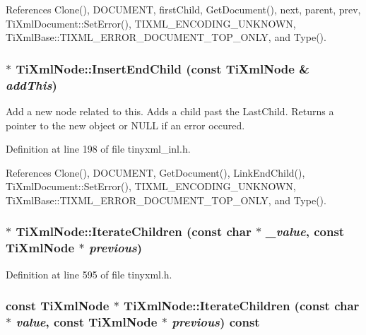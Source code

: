 References Clone(), DOCUMENT, firstChild, GetDocument(), next, parent, prev, TiXmlDocument::SetError(), TIXML\_\-ENCODING\_\-UNKNOWN, TiXmlBase::TIXML\_\-ERROR\_\-DOCUMENT\_\-TOP\_\-ONLY, and Type().\hypertarget{class_ti_xml_node_af287a913ce46d8dbf7ef24fec69bbaf0}{
\subsubsection[{InsertEndChild}]{ $\ast$ TiXmlNode::InsertEndChild (const {\bf TiXmlNode} \& {\em addThis})}}
\label{class_ti_xml_node_af287a913ce46d8dbf7ef24fec69bbaf0}
Add a new node related to this. Adds a child past the LastChild. Returns a pointer to the new object or NULL if an error occured. 

Definition at line 198 of file tinyxml\_\-inl.h.

References Clone(), DOCUMENT, GetDocument(), LinkEndChild(), TiXmlDocument::SetError(), TIXML\_\-ENCODING\_\-UNKNOWN, TiXmlBase::TIXML\_\-ERROR\_\-DOCUMENT\_\-TOP\_\-ONLY, and Type().\hypertarget{class_ti_xml_node_a67ba8275e533e6f76340236c42ea0aea}{
\subsubsection[{IterateChildren}]{$\ast$ TiXmlNode::IterateChildren (const char $\ast$ {\em \_\-value}, \/  const {\bf TiXmlNode} $\ast$ {\em previous})}}
\label{class_ti_xml_node_a67ba8275e533e6f76340236c42ea0aea}


Definition at line 595 of file tinyxml.h.\hypertarget{class_ti_xml_node_af2b86dbe25d3d26fa48180edc5e2a9fc}{
\subsubsection[{IterateChildren}]{\setlength{\rightskip}{0pt plus 5cm}const {\bf TiXmlNode} $\ast$ TiXmlNode::IterateChildren (const char $\ast$ {\em value}, \/  const {\bf TiXmlNode} $\ast$ {\em previous}) const}}
\label{class_ti_xml_node_af2b86dbe25d3d26fa48180edc5e2a9fc}


